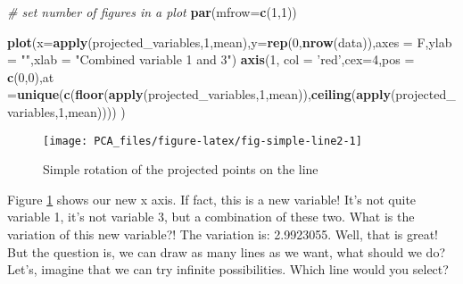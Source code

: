 \documentclass[
]{book}
\newenvironment{Shaded}{\begin{snugshade}}{\end{snugshade}}
\newcommand{\CommentTok}[1]{\textcolor[rgb]{0.56,0.35,0.01}{\textit{#1}}}
\newcommand{\DataTypeTok}[1]{\textcolor[rgb]{0.13,0.29,0.53}{#1}}
\newcommand{\DecValTok}[1]{\textcolor[rgb]{0.00,0.00,0.81}{#1}}
\newcommand{\KeywordTok}[1]{\textcolor[rgb]{0.13,0.29,0.53}{\textbf{#1}}}
\newcommand{\NormalTok}[1]{#1}
\newcommand{\StringTok}[1]{\textcolor[rgb]{0.31,0.60,0.02}{#1}}
\theoremstyle{definition}
\theoremstyle{definition}
\theoremstyle{definition}
\theoremstyle{remark}
\begin{document}
\begin{Shaded}
\begin{Highlighting}[]
\CommentTok{# set number of figures in a plot}
\KeywordTok{par}\NormalTok{(}\DataTypeTok{mfrow=}\KeywordTok{c}\NormalTok{(}\DecValTok{1}\NormalTok{,}\DecValTok{1}\NormalTok{))}


\KeywordTok{plot}\NormalTok{(}\DataTypeTok{x=}\KeywordTok{apply}\NormalTok{(projected_variables,}\DecValTok{1}\NormalTok{,mean),}\DataTypeTok{y=}\KeywordTok{rep}\NormalTok{(}\DecValTok{0}\NormalTok{,}\KeywordTok{nrow}\NormalTok{(data)),}\DataTypeTok{axes =}\NormalTok{ F,}\DataTypeTok{ylab =} \StringTok{""}\NormalTok{,}\DataTypeTok{xlab =} \StringTok{"Combined variable 1 and 3"}\NormalTok{)}
\KeywordTok{axis}\NormalTok{(}\DecValTok{1}\NormalTok{, }\DataTypeTok{col =} \StringTok{'red'}\NormalTok{,}\DataTypeTok{cex=}\DecValTok{4}\NormalTok{,}\DataTypeTok{pos =} \KeywordTok{c}\NormalTok{(}\DecValTok{0}\NormalTok{,}\DecValTok{0}\NormalTok{),}\DataTypeTok{at =}\KeywordTok{unique}\NormalTok{(}\KeywordTok{c}\NormalTok{(}\KeywordTok{floor}\NormalTok{(}\KeywordTok{apply}\NormalTok{(projected_variables,}\DecValTok{1}\NormalTok{,mean)),}\KeywordTok{ceiling}\NormalTok{(}\KeywordTok{apply}\NormalTok{(projected_variables,}\DecValTok{1}\NormalTok{,mean)))) )}
\end{Highlighting}
\end{Shaded}

\begin{figure}

{\centering \texttt{[image: PCA\_files/figure-latex/fig-simple-line2-1]} 

}

\caption{Simple rotation of the projected points on the line}\label{fig:fig-simple-line2}
\end{figure}

Figure \ref{fig:fig-simple-line2} shows our new x axis. If fact, this is a new variable! It's not quite variable 1, it's not variable 3, but a combination of these two. What is the variation of this new variable?! The variation is: 2.9923055. Well, that is great! But the question is, we can draw as many lines as we want, what should we do? Let's, imagine that we can try infinite possibilities. Which line would you select?
\end{document}
